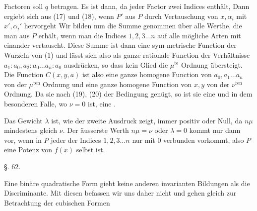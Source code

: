 Factoren soll $q$ betragen. Es ist dann, da jeder Factor zwei
Indices enth\"alt,
Dann ergiebt sich aus (17) und (18), wenn $P'$ aus $P$ durch
Vertauschung von $x, \alpha_i$ mit $x', \alpha_i'$ hervorgeht
Wir bilden nun
die Summe genommen \"uber alle Werthe, die man aus $P$ erh\"alt,
wenn man die Indices $1, 2, 3 \ldots n$ auf alle m\"ogliche Arten
mit einander vertauscht. Diese Summe ist dann eine sym\-
metrische Function der Wurzeln von (1) und l\"asst sich also als
ganze rationale Function der Verh\"altnisse $a_1 : a_0, a_2 : a_0 \ldots a_n : a_0$
ausdr\"ucken, so dass kein Glied die $\mu^{\text{te}}$ Ordnung \"ubersteigt. Die
Function $C(x, y, a)$ ist also eine ganze homogene Function von
$a_0, a_1 \ldots a_n$ von der $\mu^{\text{ten}}$ Ordnung und eine ganze homogene
Function von $x, y$ von der $\nu^{\text{ten}}$ Ordnung. Da sie nach (19), (20)
der Bedingung
gen\"ugt, so ist sie eine  und in dem besonderen
Falle, wo $\nu = 0$ ist, eine .

Das Gewicht $\lambda$ ist, wie der zweite Ausdruck zeigt, immer
positiv oder Null, da $n\mu$ mindestens gleich $\nu$. Der \"ausserste
Werth $n\mu = \nu$ oder $\lambda = 0$ kommt nur dann vor, wenn in $P$
jeder der Indices $1, 2, 3 \ldots n$ nur mit 0 verbunden vorkommt,
also $P$ eine Potenz von $f(x)$ selbst ist.

\begin{center}
\S. 62.

\end{center}

Eine bin\"are quadratische Form giebt keine anderen invarianten
 Bildungen als die Discriminante. Mit diesen befassen
wir uns daher nicht und gehen gleich zur Betrachtung der
cubischen Formen
